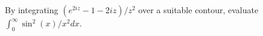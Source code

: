 By integrating $(e^{2iz}-1-2iz)/z^2$ over a suitable contour, evaluate 
$\int_0^{\infty}\sin^2(x)/x^2 dx$.
